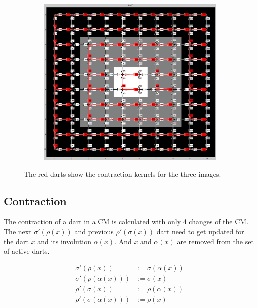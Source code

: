 \documentclass[12pt]{article}
\begin{document}
\begin{figure}[tb]
\begin{subfigure}[t]{0.3\textwidth}
      \caption{}\label{fig:dart_contract3}
    \end{subfigure}
    ~
    \begin{subfigure}[t]{0.3\textwidth}
      \includegraphics[width=\textwidth]{img/contract1.jpg}
      \caption{}\label{fig:dart_contract1}
    \end{subfigure}
  \caption{The red darts show the contraction kernels for the three images.}\label{fig:dart_contract}
\end{figure}


\subsection{Contraction} %
\label{sub:contraction}

The contraction of a dart in a CM is calculated with only 4 changes of the CM\@. The next \( \sigma'(\rho(x))\) and previous \( \rho'(\sigma(x))\) dart need to get updated for the dart  \( x \) and its involution \( \alpha(x) \). And  \( x \) and \( \alpha(x) \) are removed from the set of active darts.

\begin{align}
  \sigma'(\rho(x))   &:= \sigma(\alpha(x))    \\
  \sigma'(\rho(\alpha(x)))  &:= \sigma(x)     \\
  \rho'(\sigma(x))   &:= \rho(\alpha(x))      \\
  \rho'(\sigma(\alpha(x)))  &:= \rho(x)
\end{align}
\end{document}
